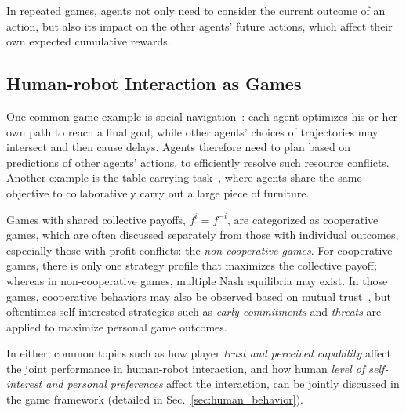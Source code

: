 \documentclass[letterpaper, 10 pt, conference]{ieeeconf}  %
\begin{document}
In repeated games, agents not only need to consider the current outcome of an 
action, but also its impact on the other agents' future actions, which affect 
their own expected cumulative rewards. 

\subsection{Human-robot Interaction as Games}
One common game example is social navigation~\cite{mavrogiannis2016decentralized}: each agent optimizes his or her own path to reach a final goal, while other agents' choices of trajectories may intersect and then cause delays. Agents therefore need to plan based on predictions of other agents' actions, to efficiently resolve such resource conflicts.  Another example is the table carrying task~\cite{nikolaidis2016formalizing}, where agents share the same objective to collaboratively carry out a large piece of furniture.

Games with shared collective payoffs, $f^i=f^{-i}$, are categorized as 
cooperative games, which are often discussed separately from those with 
individual outcomes, especially those with profit conflicts: the 
\textit{non-cooperative games}. For cooperative games, there is only one 
strategy profile that maximizes the collective payoff; whereas in 
non-cooperative games, multiple Nash equilibria may exist. In those games, 
cooperative behaviors may also be observed based on mutual trust~\cite{fujiwara2015non}, 
but oftentimes self-interested strategies such as \textit{early commitments} 
and \textit{threats} are applied to maximize personal game outcomes.

In either, common topics such as how player \textit{trust and 
perceived capability} affect the joint performance in human-robot interaction, 
and how human \textit{level of self-interest and personal preferences} affect 
the interaction, can be jointly discussed in the game framework (detailed in Sec.~\ref{sec:human_behavior}).  

\end{document}
